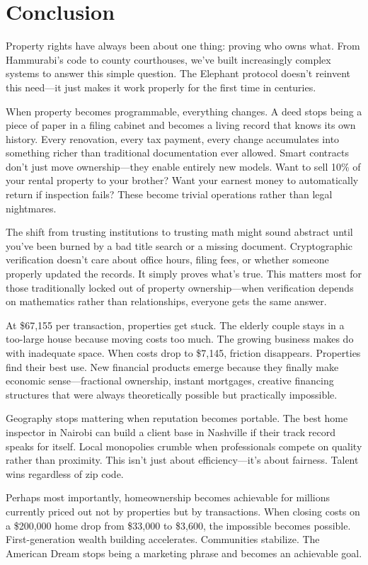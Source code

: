 \chapter{Conclusion}

Property rights have always been about one thing: proving who owns what. From Hammurabi's code to county courthouses, we've built increasingly complex systems to answer this simple question. The Elephant protocol doesn't reinvent this need—it just makes it work properly for the first time in centuries.

When property becomes programmable, everything changes. A deed stops being a piece of paper in a filing cabinet and becomes a living record that knows its own history. Every renovation, every tax payment, every change accumulates into something richer than traditional documentation ever allowed. Smart contracts don't just move ownership—they enable entirely new models. Want to sell 10\% of your rental property to your brother? Want your earnest money to automatically return if inspection fails? These become trivial operations rather than legal nightmares.

The shift from trusting institutions to trusting math might sound abstract until you've been burned by a bad title search or a missing document. Cryptographic verification doesn't care about office hours, filing fees, or whether someone properly updated the records. It simply proves what's true. This matters most for those traditionally locked out of property ownership—when verification depends on mathematics rather than relationships, everyone gets the same answer.

At \$67,155 per transaction, properties get stuck. The elderly couple stays in a too-large house because moving costs too much. The growing business makes do with inadequate space. When costs drop to \$7,145, friction disappears. Properties find their best use. New financial products emerge because they finally make economic sense—fractional ownership, instant mortgages, creative financing structures that were always theoretically possible but practically impossible.

Geography stops mattering when reputation becomes portable. The best home inspector in Nairobi can build a client base in Nashville if their track record speaks for itself. Local monopolies crumble when professionals compete on quality rather than proximity. This isn't just about efficiency—it's about fairness. Talent wins regardless of zip code.

Perhaps most importantly, homeownership becomes achievable for millions currently priced out not by properties but by transactions. When closing costs on a \$200,000 home drop from \$33,000 to \$3,600, the impossible becomes possible. First-generation wealth building accelerates. Communities stabilize. The American Dream stops being a marketing phrase and becomes an achievable goal.


